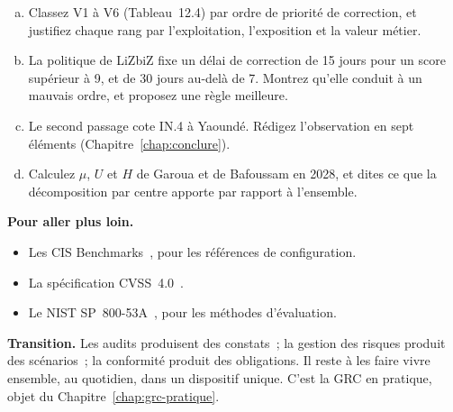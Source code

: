 \begin{boxexo}[title={\ding{45}\quad Exercice~12.4. Prioriser six vulnérabilités \niveauexpert}]
\begin{enumerate}[(a)]
    \item Classez V1 à V6 (Tableau~12.4) par ordre de priorité de
          correction, et justifiez chaque rang par l'exploitation,
          l'exposition et la valeur métier.
    \item La politique de LiZbiZ fixe un délai de correction de 15 jours pour
          un score supérieur à 9, et de 30 jours au-delà de 7. Montrez
          qu'elle conduit à un mauvais ordre, et proposez une règle
          meilleure.
    \item Le second passage cote IN.4 \NON{} à Yaoundé. Rédigez
          l'observation en sept éléments (Chapitre~\ref{chap:conclure}).
    \item Calculez $\mu$, $U$ et $H$ de Garoua et de Bafoussam en 2028, et
          dites ce que la décomposition par centre apporte par rapport à
          l'ensemble.
\end{enumerate}
\end{boxexo}

\bigskip

\begin{boxinfo}
\textbf{Pour aller plus loin.}
\begin{itemize}
    \item Les CIS Benchmarks~\cite{cis2026benchmarks}, pour les références
          de configuration.
    \item La spécification CVSS~4.0~\cite{first2023cvss4}.
    \item Le NIST SP~800-53A~\cite{nist2022sp80053a}, pour les méthodes
          d'évaluation.
\end{itemize}
\end{boxinfo}

\begin{boxinfo}
\textbf{Transition.} Les audits produisent des constats~; la gestion des
risques produit des scénarios~; la conformité produit des obligations. Il
reste à les faire vivre ensemble, au quotidien, dans un dispositif unique.
C'est la GRC en pratique, objet du Chapitre~\ref{chap:grc-pratique}.
\end{boxinfo}
